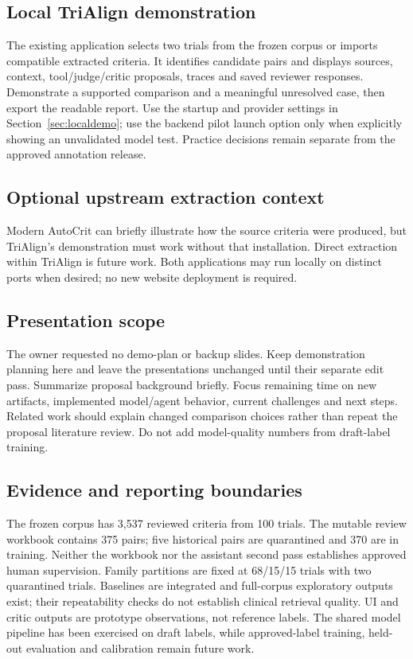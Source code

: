 \documentclass[10pt,letterpaper]{article}
\begin{document}
\subsection{Local TriAlign demonstration}\label{demo-recommended-demonstration-a-small-local-trialign-review-ui}
The existing application selects two trials from the frozen corpus or imports
compatible extracted criteria. It identifies candidate pairs and displays
sources, context, tool/judge/critic proposals, traces and saved reviewer
responses. Demonstrate a supported comparison and a meaningful unresolved
case, then export the readable report. Use the startup and provider settings
in Section~\ref{sec:localdemo}; use the backend pilot launch option only when
explicitly showing an unvalidated model test. Practice decisions remain
separate from the approved annotation release.

\subsection{Optional upstream extraction context}\label{demo-alternative-demonstration-modern-autocrit}
Modern AutoCrit can briefly illustrate how the source criteria were produced,
but TriAlign's demonstration must work without that installation. Direct
extraction within TriAlign is future work. Both applications may run locally
on distinct ports when desired; no new website deployment is required.

\subsection{Presentation scope}\label{demo-presentation-scope}
The owner requested no demo-plan or backup slides. Keep demonstration planning
here and leave the presentations unchanged until their separate edit pass.
Summarize proposal background briefly. Focus remaining time on new artifacts,
implemented model/agent behavior, current challenges and next steps. Related
work should explain changed comparison choices rather than repeat the proposal
literature review. Do not add model-quality numbers from draft-label training.

\subsection{Evidence and reporting boundaries}\label{demo-evidence-and-reporting-boundaries}
The frozen corpus has 3,537 reviewed criteria from 100 trials. The mutable
review workbook contains 375 pairs; five historical pairs are quarantined
and 370 are in training. Neither the workbook nor the assistant second pass
establishes approved human supervision. Family partitions are fixed at
68/15/15 trials with two quarantined trials. Baselines are integrated and
full-corpus exploratory outputs exist; their repeatability checks do not
establish clinical retrieval quality. UI and critic outputs are prototype
observations, not reference labels. The shared model pipeline has been exercised
on draft labels, while approved-label training, held-out evaluation and
calibration remain future work.
\end{document}
